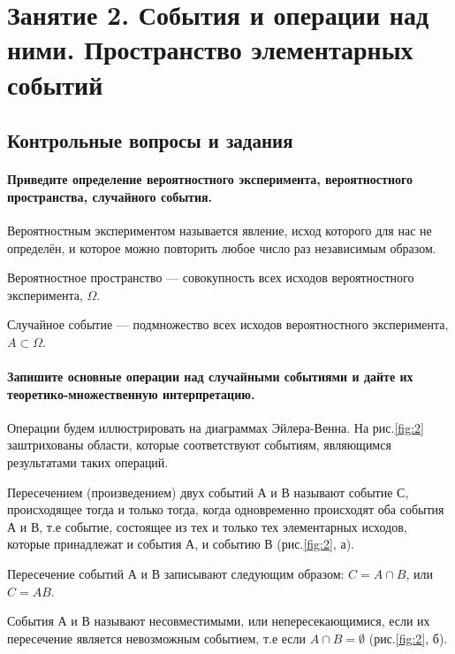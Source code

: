\chapter*{Занятие 2. События и операции над ними. Пространство элементарных событий}

\section*{Контрольные вопросы и задания}

\subsubsection*{Приведите определение вероятностного эксперимента, вероятностного пространства, случайного события.}

Вероятностным экспериментом называется явление, исход которого для нас не определён, и которое можно повторить любое число раз независимым образом.

Вероятностное пространство --- совокупность всех исходов вероятностного эксперимента, $ \Omega $.

Случайное событие --- подмножество всех исходов вероятностного эксперимента, $ A \subset \Omega $.

\subsubsection*{Запишите основные операции над случайными событиями и дайте их теоретико-множественную интерпретацию.}

Операции будем иллюстрировать на диаграммах Эйлера-Венна.
На рис.\ref{fig:2} заштрихованы области, которые соответствуют событиям, являющимся результатами таких операций.

Пересечением (произведением) двух событий А и В называют событие С, происходящее тогда и только тогда,
когда одновременно происходят оба события А и В, т.е событие,
состоящее из тех и только тех элементарных исходов, которые принадлежат и события А, и событию В (рис.\ref{fig:2}, а).

Пересечение событий А и В записывают следующим образом: $ C = A \cap B $, или $ C = AB $.

События А и В называют несовместимыми, или непересекающимися, если их пересечение является невозможным событием, т.е если $ A \cap B = \emptyset$ (рис.\ref{fig:2}, б).

